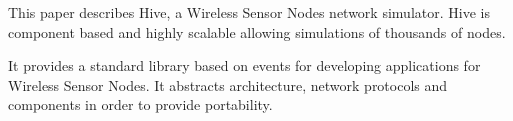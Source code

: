 This paper describes Hive, a Wireless Sensor Nodes network simulator.
Hive is component based and highly scalable allowing simulations
of thousands of nodes.

It provides a standard library based on events for developing applications
for Wireless Sensor Nodes. It abstracts architecture, network protocols and
components in order to provide portability.
